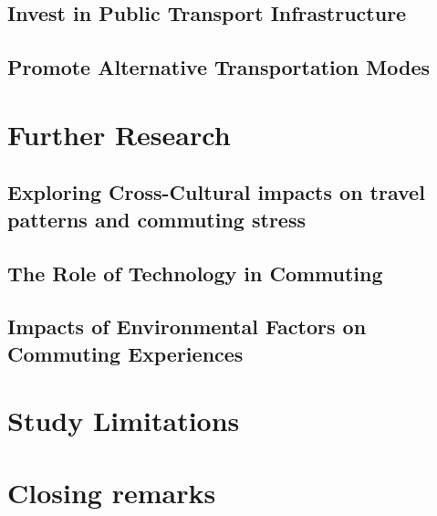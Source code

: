 \documentclass[
11pt, %
oneside, %
english, %
singlespacing, %
]{macthesis} %
\begin{document}
\hypertarget{invest-in-public-transport-infrastructure}{%
\subsection{Invest in Public Transport Infrastructure}\label{invest-in-public-transport-infrastructure}}

\hypertarget{promote-alternative-transportation-modes}{%
\subsection{Promote Alternative Transportation Modes}\label{promote-alternative-transportation-modes}}

\hypertarget{further-research}{%
\section{Further Research}\label{further-research}}

\hypertarget{exploring-cross-cultural-impacts-on-travel-patterns-and-commuting-stress}{%
\subsection{Exploring Cross-Cultural impacts on travel patterns and commuting stress}\label{exploring-cross-cultural-impacts-on-travel-patterns-and-commuting-stress}}

\hypertarget{the-role-of-technology-in-commuting}{%
\subsection{The Role of Technology in Commuting}\label{the-role-of-technology-in-commuting}}

\hypertarget{impacts-of-environmental-factors-on-commuting-experiences}{%
\subsection{Impacts of Environmental Factors on Commuting Experiences}\label{impacts-of-environmental-factors-on-commuting-experiences}}

\hypertarget{study-limitations}{%
\section{Study Limitations}\label{study-limitations}}

\hypertarget{closing-remarks}{%
\section{Closing remarks}\label{closing-remarks}}
\end{document}
